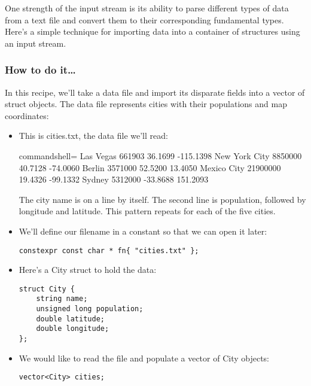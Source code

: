 
One strength of the input stream is its ability to parse different types of data from a text file and convert them to their corresponding fundamental types. Here's a simple technique for importing data into a container of structures using an input stream.

\subsubsection{How to do it…}

In this recipe, we'll take a data file and import its disparate fields into a vector of struct objects. The data file represents cities with their populations and map coordinates:

\begin{itemize}
\item 
This is cities.txt, the data file we'll read:

\begin{tcblisting}{commandshell={}}
Las Vegas
661903 36.1699 -115.1398
New York City
8850000 40.7128 -74.0060
Berlin
3571000 52.5200 13.4050
Mexico City
21900000 19.4326 -99.1332
Sydney
5312000 -33.8688 151.2093
\end{tcblisting}

The city name is on a line by itself. The second line is population, followed by longitude and latitude. This pattern repeats for each of the five cities.

\item 
We'll define our filename in a constant so that we can open it later:

\begin{lstlisting}[style=styleCXX]
constexpr const char * fn{ "cities.txt" };
\end{lstlisting}

\item 
Here's a City struct to hold the data:

\begin{lstlisting}[style=styleCXX]
struct City {
	string name;
	unsigned long population;
	double latitude;
	double longitude;
};
\end{lstlisting}

\item 
We would like to read the file and populate a vector of City objects:

\begin{lstlisting}[style=styleCXX]
vector<City> cities;
\end{lstlisting}


\end{itemize}
